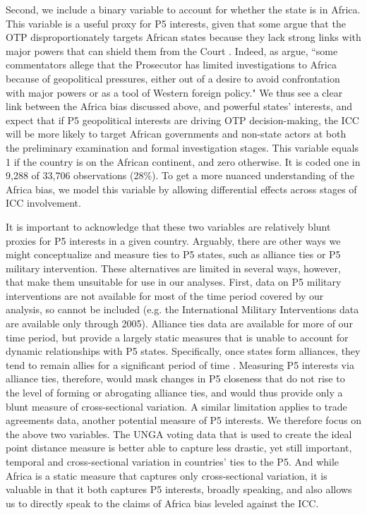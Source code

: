 Second, we include a binary variable to account for whether the state is in Africa. This variable is a useful proxy for P5 interests, given that some argue that the OTP disproportionately targets African states because they lack strong links with major powers that can shield them from the Court \citep{arieff2010international, hoile2014justice, rudolph2017power}. Indeed, as \citet[26]{arieff2010international} argue, ``some commentators allege that the Prosecutor has limited investigations to Africa because of geopolitical pressures, either out of a desire to avoid confrontation with major powers or as a tool of Western foreign policy." We thus see a clear link between the Africa bias discussed above, and powerful states' interests, and expect that if P5 geopolitical interests are driving OTP decision-making, the ICC will be more likely to target African governments and non-state actors at both the preliminary examination and formal investigation stages. This variable equals 1 if the country is on the African continent, and zero otherwise. It is coded one in 9,288 of 33,706 observations (28\%). To get a more nuanced understanding of the Africa bias, we model this variable by allowing differential effects across stages of ICC involvement.

It is important to acknowledge that these two variables are relatively blunt proxies for P5 interests in a given country. Arguably, there are other ways we might conceptualize and measure ties to P5 states, such as alliance ties or P5 military intervention. These alternatives are limited in several ways, however, that make them unsuitable for use in our analyses. First, data on P5 military interventions are not available for most of the time period covered by our analysis, so cannot be included (e.g. the International Military Interventions data \citep{pickering2009international} are available only through 2005). Alliance ties data are available for more of our time period, but provide a largely static measures that is unable to account for dynamic relationships with P5 states. Specifically, once states form alliances, they tend to remain allies for a significant period of time \citep{leeds2007terminating}. Measuring P5 interests via alliance ties, therefore, would mask changes in P5 closeness that do not rise to the level of forming or abrogating alliance ties, and would thus provide only a blunt measure of cross-sectional variation. A similar limitation applies to trade agreements data, another potential measure of P5 interests. We therefore focus on the above two variables. The UNGA voting data that is used to create the ideal point distance measure is better able to capture less drastic, yet still important, temporal and cross-sectional variation in countries' ties to the P5. And while Africa is a static measure that captures only cross-sectional variation, it is valuable in that it both captures P5 interests, broadly speaking, and also allows us to directly speak to the claims of Africa bias leveled against the ICC.


